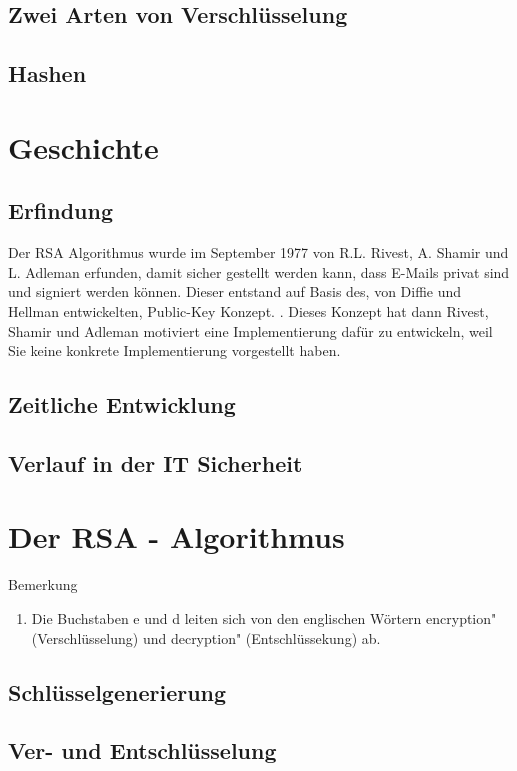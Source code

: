 \documentclass[14pt,a4paper]{scrartcl}
\begin{document}
	\subsection{Zwei Arten von Verschlüsselung}
	\subsection{Hashen} %

\section{Geschichte}
	\subsection{Erfindung}
	Der RSA Algorithmus wurde im September 1977 von R.L. Rivest, A. Shamir und L. Adleman erfunden, damit sicher gestellt werden kann, dass E-Mails privat sind und signiert werden können. Dieser entstand auf Basis des, von Diffie und Hellman entwickelten, Public-Key Konzept. \cite{1055638}. Dieses Konzept hat dann Rivest, Shamir und Adleman motiviert eine Implementierung dafür zu entwickeln, weil Sie keine konkrete Implementierung vorgestellt haben. \cite[2]{rsaOriginalPaper} 

	\subsection{Zeitliche Entwicklung}
	\subsection{Verlauf in der IT Sicherheit}

\section{Der RSA - Algorithmus}

	Bemerkung
	\begin{enumerate}
	\item Die Buchstaben e und d leiten sich von den englischen Wörtern \glqq encryption" (Verschlüsselung) und \glqq decryption" (Entschlüssekung) ab.
		\end{enumerate}
		
	\subsection{Schlüsselgenerierung}
	\subsection{Ver- und Entschlüsselung}
\end{document}
